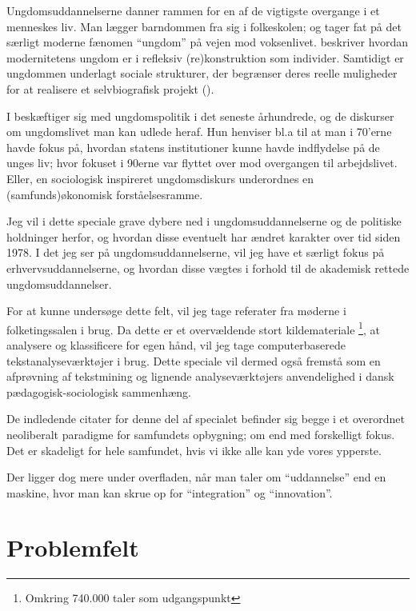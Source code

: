  Ungdomsuddannelserne danner rammen for en af de vigtigste overgange i et menneskes liv.
 Man lægger barndommen fra sig i folkeskolen; og tager fat på det særligt moderne fænomen “ungdom” på vejen mod voksenlivet.
 \citeauthor{juulDiskurserOmUngdom2013} beskriver hvordan modernitetens ungdom er i refleksiv (re)konstruktion som individer.
 Samtidigt er ungdommen underlagt sociale strukturer, der begrænser deres reelle muligheder for at realisere et selvbiografisk projekt (\citeyear[s. 11]{juulDiskurserOmUngdom2013}).

I  beskæftiger \citeauthor{juulDiskurserOmUngdom2013} sig med ungdomspolitik i det seneste århundrede, og de diskurser om ungdomslivet man kan udlede heraf.
Hun henviser bl.a til at man i 70'erne havde fokus på, hvordan statens institutioner kunne havde indflydelse på de unges liv; hvor fokuset i 90erne var flyttet over mod overgangen til arbejdslivet.
Eller, en sociologisk inspireret ungdomsdiskurs underordnes en (samfunds)økonomisk forståelsesramme.

Jeg vil i dette speciale grave dybere ned i ungdomsuddannelserne og de politiske holdninger herfor, og hvordan disse eventuelt har ændret karakter over tid siden 1978.
I det jeg ser på ungdomsuddannelserne, vil jeg have et særligt fokus på erhvervsuddannelserne, og hvordan disse vægtes i forhold til de akademisk rettede ungdomsuddannelser.

For at kunne undersøge dette felt, vil jeg tage referater fra møderne i folketingssalen i brug.
Da dette er et overvældende stort kildemateriale \footnote{Omkring 740.000 taler som udgangspunkt}, at analysere og klassificere for egen hånd, vil jeg tage computerbaserede tekstanalyseværktøjer i brug.
Dette speciale vil dermed også fremstå som en afprøvning af tekstmining og lignende analyseværktøjers anvendelighed i dansk pædagogisk-sociologisk sammenhæng.

De indledende citater for denne del af specialet befinder sig begge i et overordnet neoliberalt paradigme for samfundets opbygning; om end med forskelligt fokus.
Det er skadeligt for hele samfundet, hvis vi ikke alle kan yde vores ypperste.

Der ligger dog mere under overfladen, når man taler om “uddannelse” end en maskine, hvor man kan skrue op for “integration” og “innovation”.

\chapter{Problemfelt}\label{sec:problem}

